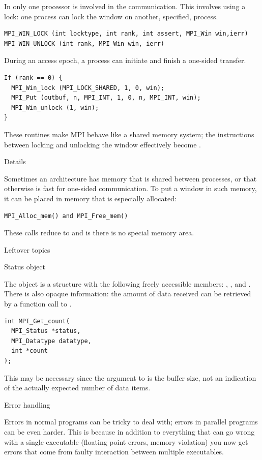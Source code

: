 In  only one processor
is involved in the communication. This involves using
a lock: one process can lock the window
on another, specified, process.
\begin{verbatim}
MPI_WIN_LOCK (int locktype, int rank, int assert, MPI_Win win,ierr)
MPI_WIN_UNLOCK (int rank, MPI_Win win, ierr)
\end{verbatim}
During an access epoch, a process can initiate and finish a one-sided
transfer.
\begin{verbatim}
If (rank == 0) {
  MPI_Win_lock (MPI_LOCK_SHARED, 1, 0, win);
  MPI_Put (outbuf, n, MPI_INT, 1, 0, n, MPI_INT, win);
  MPI_Win_unlock (1, win);
}
\end{verbatim}
These routines make MPI behave like a shared memory system; the
instructions between locking and unlocking the window effectively
become .

 {Details}

Sometimes an architecture has memory that is shared between processes,
or that otherwise is fast for one-sided communication. To put a window
in such memory, it can be placed in memory that is especially
allocated:
\begin{verbatim}
MPI_Alloc_mem() and MPI_Free_mem()
\end{verbatim}
These calls reduce to  and  is there is no special
memory area.

 {Leftover topics}

 {Status object}

The  object is a structure with the following 
freely accessible members:
, , and . There is also opaque 
information: the amount of data received can be retrieved by 
a function call to .
\begin{verbatim}
int MPI_Get_count(
  MPI_Status *status,
  MPI_Datatype datatype,
  int *count
);
\end{verbatim}
This may be necessary since the  argument to  is 
the buffer size, not an indication of the actually expected number of
data items.

 {Error handling}
\label{mpi:error}

Errors in normal programs can be tricky to deal with; errors in
parallel programs can be even harder. This is because in addition to
everything that can go wrong with a single executable (floating point
errors, memory violation) you now get errors that come from faulty
interaction between multiple executables.

